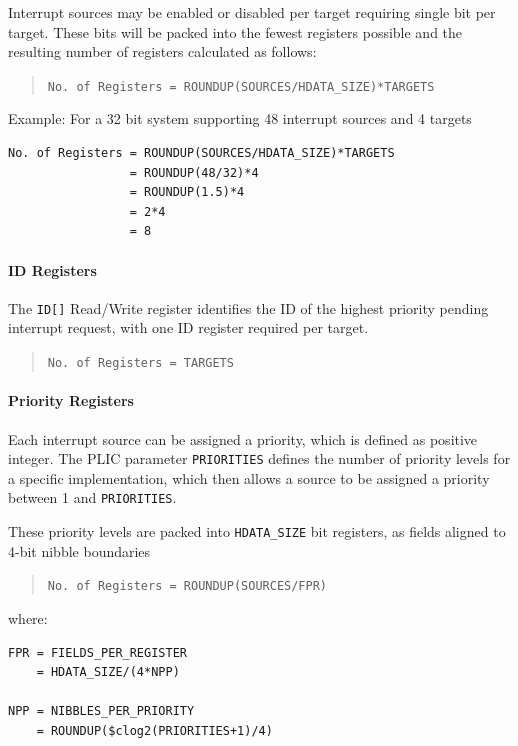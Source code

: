 Interrupt sources may be enabled or disabled per target requiring single
bit per target. These bits will be packed into the fewest registers
possible and the resulting number of registers calculated as follows:

\begin{quote}
\texttt{No.\ of\ Registers\ =\ ROUNDUP(SOURCES/HDATA\_SIZE)*TARGETS}
\end{quote}

Example: For a 32 bit system supporting 48 interrupt sources and 4
targets

\begin{verbatim}
No. of Registers = ROUNDUP(SOURCES/HDATA_SIZE)*TARGETS
                 = ROUNDUP(48/32)*4
                 = ROUNDUP(1.5)*4
                 = 2*4
                 = 8
\end{verbatim}

\paragraph{ID Registers}

The \texttt{ID[]} Read/Write
register identifies the ID of the highest priority pending interrupt
request, with one ID register required per target.

\begin{quote}
\texttt{No.\ of\ Registers\ =\ TARGETS}
\end{quote}

\paragraph{Priority Registers}

Each interrupt source can be assigned a priority, which is defined as
positive integer. The PLIC parameter \texttt{PRIORITIES} defines the
number of priority levels for a specific implementation, which then
allows a source to be assigned a priority between 1 and
\texttt{PRIORITIES}.

These priority levels are packed into
\texttt{HDATA\_SIZE} bit registers, as fields aligned to
4-bit nibble boundaries

\begin{quote}
\texttt{No.\ of\ Registers\ =\ ROUNDUP(SOURCES/FPR)}
\end{quote}

where:

\begin{verbatim}
FPR = FIELDS_PER_REGISTER
    = HDATA_SIZE/(4*NPP)

NPP = NIBBLES_PER_PRIORITY
    = ROUNDUP($clog2(PRIORITIES+1)/4)
\end{verbatim}

